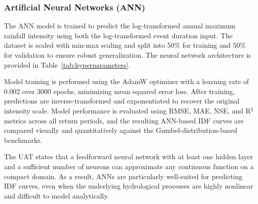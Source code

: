 \subsubsection{Artificial Neural Networks (ANN)}

The ANN model is trained to predict the log-transformed annual maximum rainfall intensity using both the log-transformed event duration input. The dataset is scaled with min-max scaling and split into 50\% for training and 50\% for validation to ensure robust generalization. The neural network architecture is provided in Table~\ref{tab:hyperparameters}.

\vspace{1em}

Model training is performed using the AdamW optimizer with a learning rate of 0.002 over 3000 epochs, minimizing mean squared error loss. After training, predictions are inverse-transformed and exponentiated to recover the original intensity scale. Model performance is evaluated using RMSE, MAE, NSE, and R$^{2}$ metrics across all return periods, and the resulting ANN-based IDF curves are compared visually and quantitatively against the Gumbel-distribution-based benchmarks.

\vspace{1em}

The UAT states that a feedforward neural network with at least one hidden layer and a sufficient number of neurons can approximate any continuous function on a compact domain. As a result, ANNs are particularly well-suited for predicting IDF curves, even when the underlying hydrological processes are highly nonlinear and difficult to model analytically.